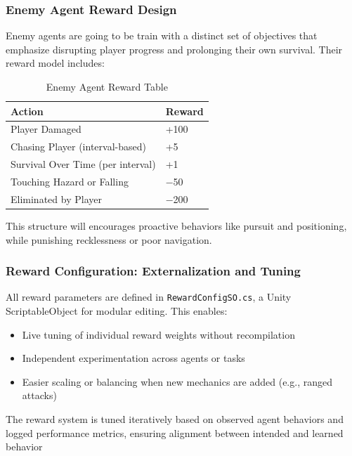 \documentclass[12pt,oneside,openright,a4paper]{cpe-english-project}
\begin{document}
\subsubsection{Enemy Agent Reward Design}

Enemy agents are going to be train with a distinct set of objectives that emphasize disrupting player progress and prolonging their own survival. Their reward model includes:

\begin{table}[!h]
\caption{Enemy Agent Reward Table}
\label{tbl:EnemyAgentRewardTable}
\begin{tabular}{|l|l|} \hline
\textbf{Action} & \textbf{Reward} \\ \hline
Player Damaged & +100 \\
Chasing Player (interval-based) & +5 \\
Survival Over Time (per interval) & +1 \\
Touching Hazard or Falling & −50 \\
Eliminated by Player & −200 \\ \hline
\end{tabular}
\end{table}

This structure will encourages proactive behaviors like pursuit and positioning, while punishing recklessness or poor navigation.

\subsubsection{Reward Configuration: Externalization and Tuning}

All reward parameters are defined in \texttt{RewardConfigSO.cs}, a Unity ScriptableObject for modular editing. This enables:

\begin{itemize}
\item Live tuning of individual reward weights without recompilation
\item Independent experimentation across agents or tasks
\item Easier scaling or balancing when new mechanics are added (e.g., ranged attacks)
\end{itemize}

The reward system is tuned iteratively based on observed agent behaviors and logged performance metrics, ensuring alignment between intended and learned behavior

\end{document}

